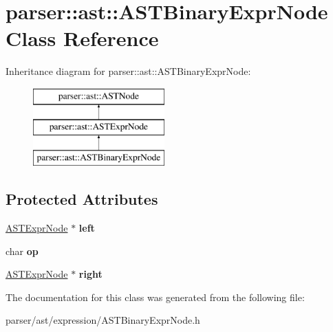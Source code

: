 \hypertarget{classparser_1_1ast_1_1ASTBinaryExprNode}{}\section{parser\+:\+:ast\+:\+:A\+S\+T\+Binary\+Expr\+Node Class Reference}
\label{classparser_1_1ast_1_1ASTBinaryExprNode}
Inheritance diagram for parser\+:\+:ast\+:\+:A\+S\+T\+Binary\+Expr\+Node\+:\begin{figure}[H]
\begin{center}
\leavevmode
\includegraphics[height=3.000000cm]{d9/da4/classparser_1_1ast_1_1ASTBinaryExprNode}
\end{center}
\end{figure}
\subsection*{Protected Attributes}
\begin{DoxyCompactItemize}
\item 
\mbox{\label{classparser_1_1ast_1_1ASTBinaryExprNode_a9c53c37ccba708edadd2099697be5417}} 
\hyperlink{classparser_1_1ast_1_1ASTExprNode}{A\+S\+T\+Expr\+Node} $\ast$ {\bfseries left}
\item 
\mbox{\label{classparser_1_1ast_1_1ASTBinaryExprNode_a6dda3d2c2445f8372c3e37c4f9e4e534}} 
char {\bfseries op}
\item 
\mbox{\label{classparser_1_1ast_1_1ASTBinaryExprNode_abbfcf1c89bbf63f1b849927b5d61d692}} 
\hyperlink{classparser_1_1ast_1_1ASTExprNode}{A\+S\+T\+Expr\+Node} $\ast$ {\bfseries right}
\end{DoxyCompactItemize}


The documentation for this class was generated from the following file\+:\begin{DoxyCompactItemize}
\item 
parser/ast/expression/A\+S\+T\+Binary\+Expr\+Node.\+h\end{DoxyCompactItemize}
